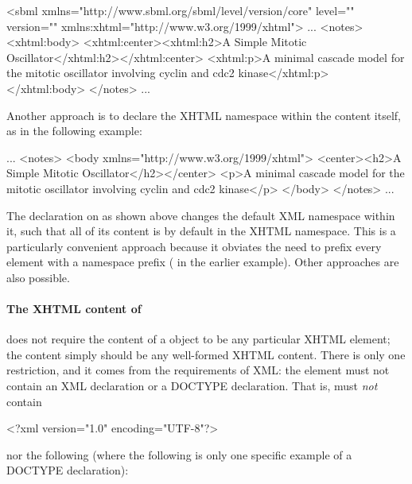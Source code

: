 \clearpagevertwo

\begin{example}
<sbml xmlns="http://www.sbml.org/sbml/level\sbmllevel/version\sbmlversionnum/core" level="\sbmllevel" version="\sbmlversionnum"
      xmlns:xhtml="http://www.w3.org/1999/xhtml">
  ...
  <notes>
    <xhtml:body>
      <xhtml:center><xhtml:h2>A Simple Mitotic Oscillator</xhtml:h2></xhtml:center>
      <xhtml:p>A minimal cascade model for the mitotic oscillator
      involving cyclin and cdc2 kinase</xhtml:p>
    </xhtml:body>
  </notes>
  ...
\end{example}

Another approach is to declare the XHTML namespace within the
 content itself, as in the following example:

\begin{example}
...
<notes>
  <body xmlns="http://www.w3.org/1999/xhtml">
    <center><h2>A Simple Mitotic Oscillator</h2></center>
    <p>A minimal cascade model for the mitotic oscillator involving cyclin and cdc2 kinase</p>
  </body>
</notes>
...
\end{example}

The  declaration on
 as shown above changes the default XML namespace
within it, such that all of its content is by default in the XHTML
namespace.  This is a particularly convenient approach because it
obviates the need to prefix every element with a namespace prefix
(\ie {} in the earlier example).  Other
approaches are also possible.


\paragraph{The XHTML content of }

\sbmlthree does not require the content of a \Notes object to be
any particular XHTML element; the content simply should be any
well-formed XHTML content.  There is only one restriction, and it
comes from the requirements of XML: the  element must
not contain an XML declaration or a DOCTYPE declaration.  That
is,  must \emph{not} contain

\begin{example}
<?xml version="1.0" encoding="UTF-8"?>  
\end{example}

nor the following (where the following is only one specific
example of a DOCTYPE declaration):

